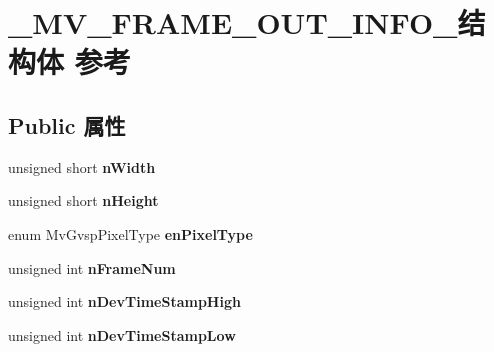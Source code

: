 \hypertarget{struct___m_v___f_r_a_m_e___o_u_t___i_n_f_o__}{}\section{\+\_\+\+M\+V\+\_\+\+F\+R\+A\+M\+E\+\_\+\+O\+U\+T\+\_\+\+I\+N\+F\+O\+\_\+结构体 参考}
\label{struct___m_v___f_r_a_m_e___o_u_t___i_n_f_o__}
\subsection*{Public 属性}
\begin{DoxyCompactItemize}
\item 
\mbox{\label{struct___m_v___f_r_a_m_e___o_u_t___i_n_f_o___a120f0ddafeb11cb5774bb7052fac7c73}} 
unsigned short {\bfseries n\+Width}
\item 
\mbox{\label{struct___m_v___f_r_a_m_e___o_u_t___i_n_f_o___a9d1765f7047d497013578620a06598f0}} 
unsigned short {\bfseries n\+Height}
\item 
\mbox{\label{struct___m_v___f_r_a_m_e___o_u_t___i_n_f_o___aa737a211a43138ebc78bcd1968fd5462}} 
enum Mv\+Gvsp\+Pixel\+Type {\bfseries en\+Pixel\+Type}
\item 
\mbox{\label{struct___m_v___f_r_a_m_e___o_u_t___i_n_f_o___a6dd94aa4313ef2ad9079fd33085bd47c}} 
unsigned int {\bfseries n\+Frame\+Num}
\item 
\mbox{\label{struct___m_v___f_r_a_m_e___o_u_t___i_n_f_o___af5ddaacd7b7f68372886155b78b26557}} 
unsigned int {\bfseries n\+Dev\+Time\+Stamp\+High}
\item 
\mbox{\label{struct___m_v___f_r_a_m_e___o_u_t___i_n_f_o___ae30f0703b40c7e9b9fca2ba3072d2f9b}} 
unsigned int {\bfseries n\+Dev\+Time\+Stamp\+Low}
\item 
\mbox{\label{struct___m_v___f_r_a_m_e___o_u_t___i_n_f_o___aaee8810c6f8a541764cbc7494ba0eaa7}} 

\end{DoxyCompactItemize}
